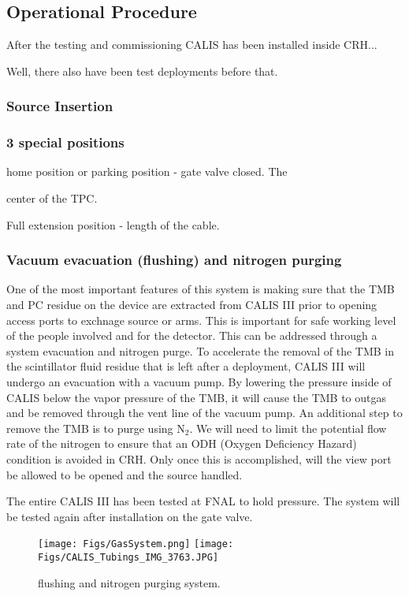 
\subsection{Operational Procedure}
After the testing and commissioning CALIS has been installed inside CRH... 

Well, there also have been test deployments before that.
\subsubsection{Source Insertion}

\subsubsection{3 special positions}
home position or parking position - gate valve closed. The 

center of the TPC.

Full extension position - length of the cable.


\subsubsection{Vacuum evacuation (flushing) and nitrogen purging}
   One of the most important features of this system is making sure that the TMB and PC residue on the device are extracted from CALIS III prior to opening access ports to exchnage source or arms. This is  important for  safe working level of the people involved and for the detector.  This can be addressed through a system evacuation and nitrogen purge.  To accelerate the removal of the TMB in the scintillator fluid residue that is left after a deployment, CALIS III will undergo an evacuation with a vacuum pump. By lowering the pressure inside of CALIS below the vapor pressure of the TMB, it will cause the TMB to outgas and be removed through the vent line of the vacuum pump. An additional step to remove the TMB is to purge using N$_{2}$.  We will need to limit the potential flow rate of the nitrogen to ensure that an ODH (Oxygen Deficiency Hazard) condition is avoided in CRH.  Only once this is accomplished, will the view port be allowed to be opened and the source handled.     
  
The entire CALIS III  has been tested at FNAL  to hold pressure.  The system will be tested again after installation on the gate valve.
 

\begin{figure}[htbp]
 \centering
  \texttt{[image: Figs/GasSystem.png]}
  \texttt{[image: Figs/CALIS\_Tubings\_IMG\_3763.JPG]}
  \caption{flushing and nitrogen purging system.}
  \label{fig:flushing_purging}
\end{figure}




